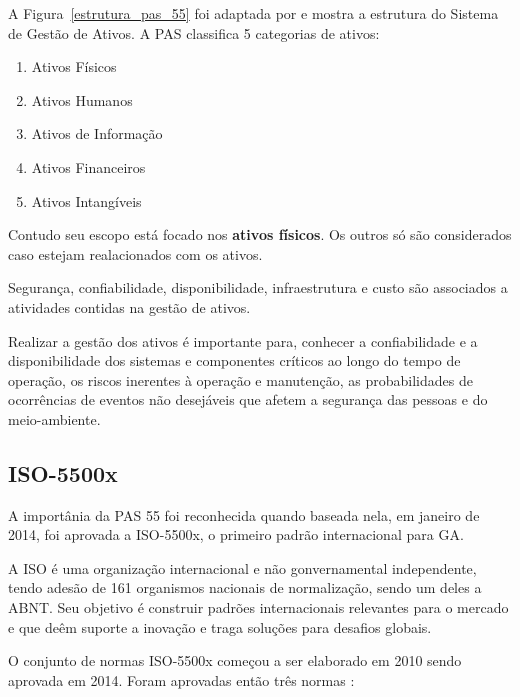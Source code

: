 A Figura~\ref{estrutura_pas_55} foi adaptada por \cite{valeria2013} e mostra a estrutura do Sistema de Gestão de Ativos. A PAS classifica 5 categorias de ativos:

\begin{enumerate}
	\item{Ativos Físicos}
	\item{Ativos Humanos}
	\item{Ativos de Informação}
	\item{Ativos Financeiros}
	\item{Ativos Intangíveis}
\end{enumerate}

Contudo seu escopo está focado nos \textbf{ativos físicos}. Os outros só são considerados caso estejam realacionados com os ativos.

Segurança, confiabilidade, disponibilidade, infraestrutura e custo são associados a atividades contidas na gestão de ativos. 

Realizar a gestão dos ativos é importante para, conhecer a confiabilidade e a disponibilidade dos sistemas e componentes críticos ao longo do tempo de operação, os riscos inerentes à operação e manutenção, as probabilidades de ocorrências de eventos não desejáveis que afetem a segurança das pessoas e do meio-ambiente.


\subsection{ISO-5500x}

A importânia da PAS 55 foi reconhecida quando baseada nela, em janeiro de 2014, foi aprovada a ISO-5500x, o primeiro padrão internacional para GA. 

A ISO é uma organização internacional e não gonvernamental independente, tendo adesão de 161 organismos nacionais de normalização, sendo um deles a ABNT. Seu objetivo é construir padrões internacionais relevantes para o mercado e que deêm suporte a inovação e traga soluções para desafios globais.

O conjunto de normas ISO-5500x começou a ser elaborado em 2010 sendo aprovada em 2014. Foram aprovadas então três normas \cite{abraman}:

